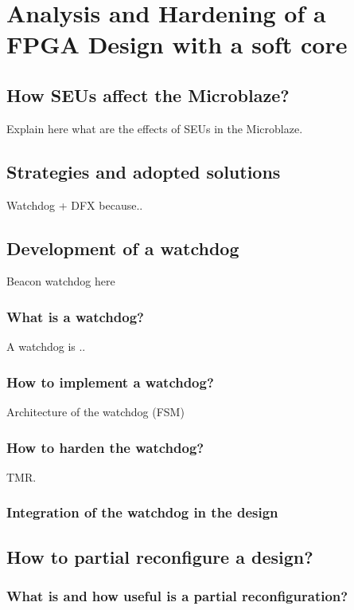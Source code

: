 \chapter{Analysis and Hardening of a FPGA Design with a soft core}


\section{How SEUs affect the Microblaze?}

Explain here what are the effects of SEUs in the Microblaze.

\section{Strategies and adopted solutions}
Watchdog + DFX because..

\section{Development of a watchdog}

Beacon watchdog here

\subsection{What is a watchdog?}

A watchdog is ..

\subsection{How to implement a watchdog?}

Architecture of the watchdog (FSM)

\subsection{How to harden the watchdog?}

TMR.

\subsection{Integration of the watchdog in the design}

\section{How to partial reconfigure a design?}
\subsection{What is and how useful is a partial reconfiguration?}
